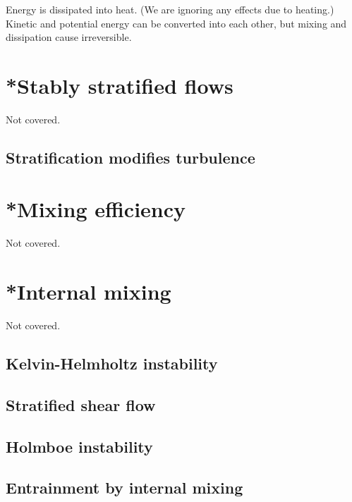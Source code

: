 Energy is dissipated into heat. (We are ignoring any effects due to heating.) Kinetic and potential energy can be converted into each other, but mixing and dissipation cause irreversible. 

\section{*Stably stratified flows}
Not covered.
\subsection{Stratification modifies turbulence}

\section{*Mixing efficiency}
Not covered.

\section{*Internal mixing}
Not covered. 
\subsection{Kelvin-Helmholtz instability}

\subsection{Stratified shear flow}
\subsection{Holmboe instability}
\subsection{Entrainment by internal mixing}
